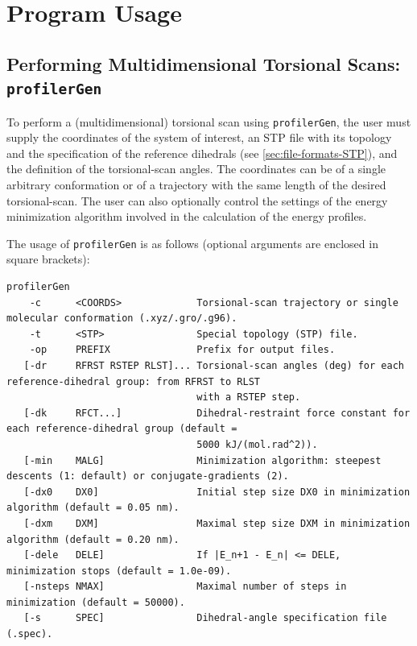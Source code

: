 \documentclass[10pt,a4paper,openany]{memoir}
\numberwithin{equation}{section}
\newcommand{\profilergen}[0]{\texttt{profilerGen}}
\begin{document}
\section{Program Usage}
\label{chap:program-usage}

\subsection{Performing Multidimensional Torsional Scans: \profilergen{}}
\label{sec:program-gen}

To perform a (multidimensional) torsional scan using \profilergen{}, the user
must supply the coordinates of the system of interest, an STP file with its
topology and the specification of the reference dihedrals (see
\autoref{sec:file-formats-STP}), and the definition of the torsional-scan
angles. The coordinates can be of a single arbitrary conformation or of a
trajectory with the same length of the desired torsional-scan.  The user can
also optionally control the settings of the energy minimization algorithm
involved in the calculation of the energy profiles.

The usage of \profilergen{} is as follows (optional arguments are enclosed in
square brackets):

\begin{lstlisting}
profilerGen
    -c      <COORDS>             Torsional-scan trajectory or single molecular conformation (.xyz/.gro/.g96).
    -t      <STP>                Special topology (STP) file.
    -op     PREFIX               Prefix for output files.
   [-dr     RFRST RSTEP RLST]... Torsional-scan angles (deg) for each reference-dihedral group: from RFRST to RLST 
                                 with a RSTEP step.
   [-dk     RFCT...]             Dihedral-restraint force constant for each reference-dihedral group (default = 
                                 5000 kJ/(mol.rad^2)).
   [-min    MALG]                Minimization algorithm: steepest descents (1: default) or conjugate-gradients (2).
   [-dx0    DX0]                 Initial step size DX0 in minimization algorithm (default = 0.05 nm).
   [-dxm    DXM]                 Maximal step size DXM in minimization algorithm (default = 0.20 nm).
   [-dele   DELE]                If |E_n+1 - E_n| <= DELE, minimization stops (default = 1.0e-09).
   [-nsteps NMAX]                Maximal number of steps in minimization (default = 50000).
   [-s      SPEC]                Dihedral-angle specification file (.spec).
\end{lstlisting}\vspace{2ex} 
\end{document}
